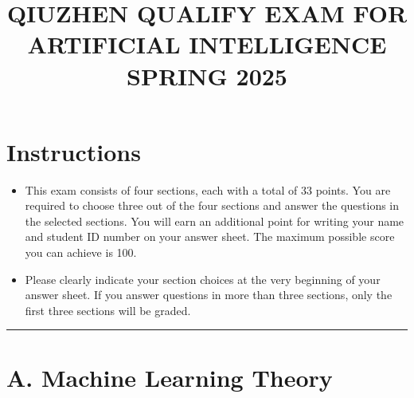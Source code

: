 \documentclass[11pt,a4paper]{article}
\title{\textbf{QIUZHEN QUALIFY EXAM FOR ARTIFICIAL INTELLIGENCE}\\[0.5em]\Large SPRING 2025}
\date{}
\author{}
\begin{document}
\maketitle
\vspace{-3em}

\section*{Instructions}
\begin{itemize}
    \item This exam consists of four sections, each with a total of 33 points. You are required to choose three out of the four sections and answer the questions in the selected sections. You will earn an additional point for writing your name and student ID number on your answer sheet. The maximum possible score you can achieve is 100.
    \item Please clearly indicate your section choices at the very beginning of your answer sheet. If you answer questions in more than three sections, only the first three sections will be graded.
\end{itemize}

\noindent\rule{\linewidth}{0.4pt}

\section*{A. Machine Learning Theory}
\end{document}
